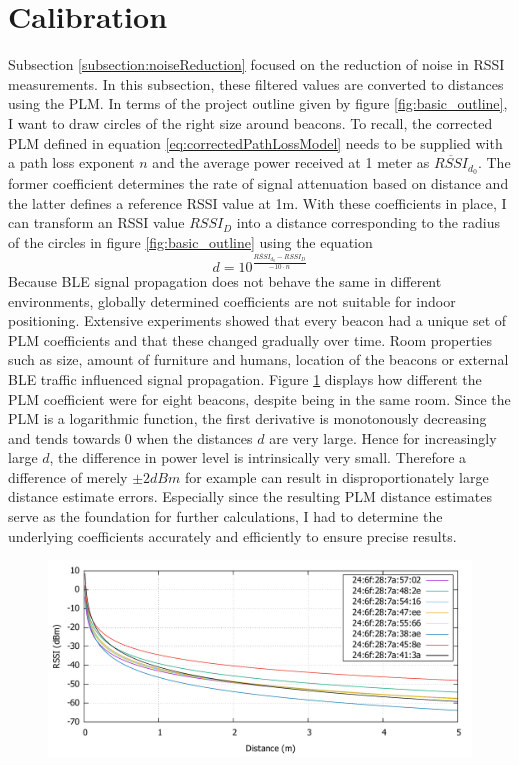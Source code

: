 \documentclass[a4paper, oneside]{ipsreport}
\begin{document}
\section{Calibration}
Subsection \ref{subsection:noiseReduction} focused on the reduction of noise in RSSI measurements. In this subsection, these filtered values are converted to distances using the PLM. In terms of the project outline given by figure \ref{fig:basic_outline}, I want to draw circles of the right size around beacons. To recall, the corrected PLM defined in equation \ref{eq:correctedPathLossModel} needs to be supplied with a path loss exponent $n$ and the average power received at 1 meter as $\overline{RSSI}_{d_0}$. The former coefficient determines the rate of signal attenuation based on distance and the latter defines a reference RSSI value at 1m. With these coefficients in place, I can transform an RSSI value $RSSI_D$ into a distance  corresponding to the radius of the circles in figure \ref{fig:basic_outline} using the equation
\begin{equation} \label{eq:distanceformula}
	d = 10^{\frac{\overline{RSSI}_{d_0} - RSSI_D}{-10 \cdot n}}
\end{equation}
Because BLE signal propagation does not behave the same in different environments, globally determined coefficients are not suitable for indoor positioning. Extensive experiments showed that every beacon had a unique set of PLM coefficients and that these changed gradually over time. Room properties such as size, amount of furniture and humans, location of the beacons or external BLE traffic influenced signal propagation. Figure \ref{fig:pathlossmodel} displays how different the PLM coefficient were for eight beacons, despite being in the same room. Since the PLM is a logarithmic function, the first derivative is monotonously decreasing and tends towards 0 when the distances $d$ are very large. Hence for increasingly large $d$, the difference in power level is intrinsically very small. Therefore a difference of merely $\pm 2 dBm$ for example can result in disproportionately large distance estimate errors. Especially since the resulting PLM distance estimates serve as the foundation for further calculations, I had to determine the underlying coefficients accurately and efficiently to ensure precise results.
\begin{figure}[h]
	\centering
	\includegraphics[width=\linewidth]{./figures/plm.pdf}
	\label{fig:pathlossmodel}
\end{figure}
\end{document}
